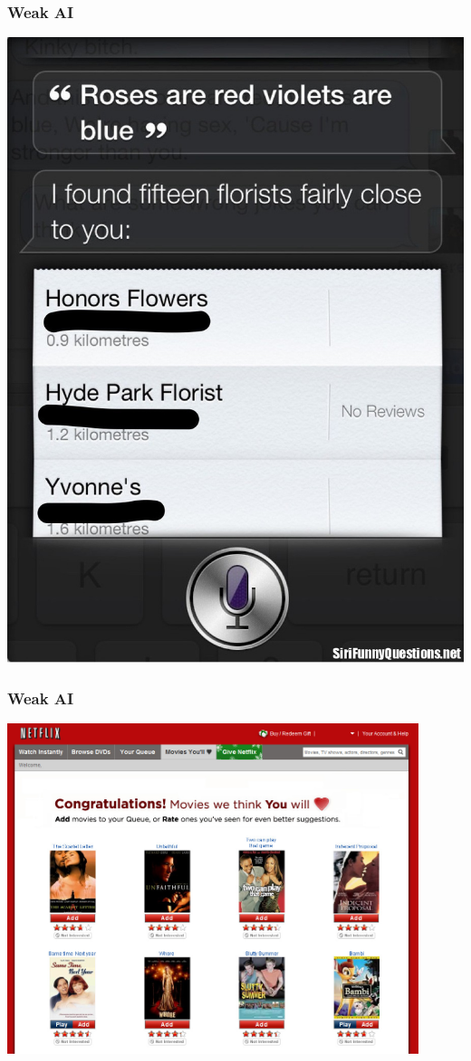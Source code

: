 \documentclass[10pt, compress]{beamer}
\begin{document}
\begin{frame}
  \frametitle{Weak AI}
  \begin{center}
  \includegraphics[height=\textheight]{images/siri.jpg}
  \end{center}
\end{frame}

\begin{frame}
  \frametitle{Weak AI}
  \begin{center}
  \includegraphics[width=0.9\textwidth]{images/netflix.jpg}
  \end{center}
\end{frame}
\end{document}
